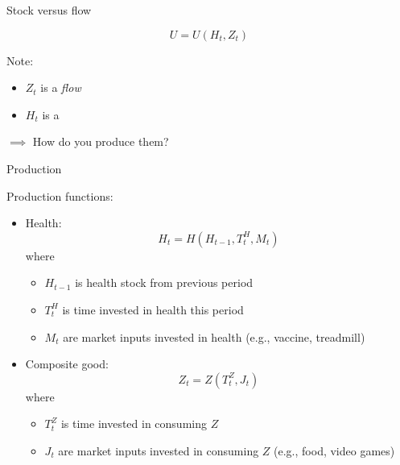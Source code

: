 \begin{frame}{Stock versus flow}

    \begin{equation*}
        U = U\left( H_t, Z_t \right)
    \end{equation*}

    Note:
    \begin{itemize}
        \item $Z_t$ is a \textit{flow}
        \item $H_t$ is a 
    \end{itemize}
    $\implies$ How do you produce them?

\end{frame}
\begin{frame}{Production}

    Production functions:
    \begin{itemize}
        \item Health:
        \begin{equation*}
            H_t = H\left(H_{t-1}, T_t^H, M_t \right)
        \end{equation*}
        where
        \begin{itemize}
            \item $H_{t-1}$ is health stock from previous period
            \item $T_t^H$ is time invested in health this period
            \item $M_t$ are market inputs invested in health (e.g., vaccine, treadmill)
        \end{itemize}
        \pause
        \item Composite good:
        \begin{equation*}
            Z_t = Z\left( T_t^Z, J_t \right)
        \end{equation*}
        where
        \begin{itemize}
            \item $T_t^Z$ is time invested in consuming $Z$
            \item $J_t$ are market inputs invested in consuming $Z$ (e.g., food, video games)
        \end{itemize}
    \end{itemize}
\end{frame}
